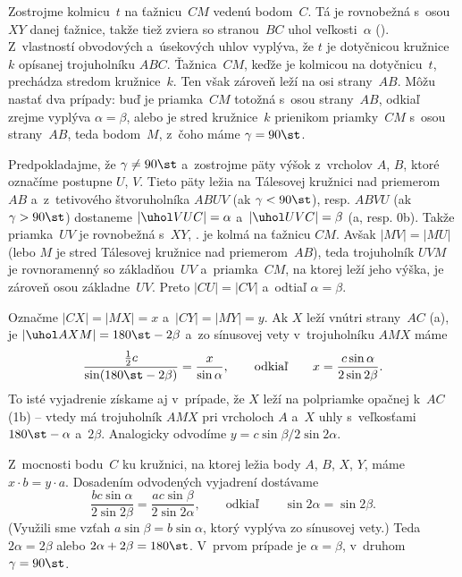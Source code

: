 {\ineriesenie
Zostrojme kolmicu~$t$ na ťažnicu~$CM$ vedenú bodom~$C$. Tá je rovnobežná s~osou $XY$ danej ťažnice, takže tiež zviera so stranou~$BC$ uhol %
veľkosti~$\alpha$ (\obr). Z~vlastností obvodových a~úsekových uhlov vyplýva, že $t$ je dotyčnicou kružnice~$k$ opísanej trojuholníku $ABC$. Ťažnica~$CM$, keďže je kolmicou na dotyčnicu~$t$, prechádza stredom kružnice~$k$. Ten však zároveň leží na osi strany~$AB$. Môžu nastať dva prípady: buď je priamka~$CM$ totožná s~osou strany~$AB$, odkiaľ zrejme vyplýva $\alpha=\beta$, alebo je stred kružnice~$k$ prienikom priamky~$CM$ s~osou strany~$AB$, teda bodom~$M$, z~čoho máme $\gamma=90\st$.

\ineriesenie
Predpokladajme, že $\gamma\ne90\st$ a~zostrojme päty výšok z~vrcholov $A$, $B$, ktoré označíme postupne $U$, $V$. Tieto päty ležia na Tálesovej kružnici nad priemerom~$AB$ a~z~tetivového štvoruholníka $ABUV$ (ak $\gamma<90\st$), resp. $ABVU$ (ak $\gamma>90\st$) dostaneme $|\uhol VUC|=\alpha$ a~$|\uhol UVC|=\beta$ (\obr{}a, resp. \obrrnum0b). Takže priamka~$UV$ je rovnobežná s~$XY$, \tj. je kolmá na ťažnicu $CM$. Avšak $|MV|=|MU|$ (lebo $M$ je stred Tálesovej kružnice nad priemerom~$AB$), teda trojuholník $UVM$ je rovnoramenný so základňou~$UV$ a~priamka~$CM$, na ktorej leží jeho výška, je zároveň osou základne~$UV$. Preto $|CU|=|CV|$ a~odtiaľ $\alpha=\beta$.
%

\ineriesenie
Označme $|CX|=|MX|=x$ a~$|CY|=|MY|=y$. Ak $X$ leží vnútri strany~$AC$ (\obr{}a), je $|\uhol AXM|=180\st-2\beta$ a~zo sínusovej vety v~trojuholníku $AMX$ máme
$$
\frac{\frac12c}{\sin(180\st-2\beta)}=\frac x{\sin\alpha},\qquad\text{odkiaľ}\qquad x=\frac{c\sin\alpha}{2\sin2\beta}.
$$
To isté vyjadrenie získame aj v~prípade, že $X$ leží na polpriamke opačnej k~$AC$ (\obrr1b) -- vtedy má trojuholník $AMX$ pri vrcholoch $A$ a~$X$ uhly s~veľkosťami $180\st-\alpha$ a~$2\beta$. Analogicky odvodíme $y=c\sin\beta/2\sin2\alpha$.
%

Z~mocnosti bodu~$C$ ku kružnici, na ktorej ležia body $A$, $B$, $X$, $Y$, máme $x\cdot b=y\cdot a$. Dosadením odvodených vyjadrení dostávame
$$
\frac{bc\sin\alpha}{2\sin2\beta}=\frac{ac\sin\beta}{2\sin2\alpha},\qquad\text{odkiaľ}\qquad \sin2\alpha=\sin2\beta.
$$
(Využili sme vzťah $a\sin\beta=b\sin\alpha$, ktorý vyplýva zo sínusovej vety.) Teda $2\alpha=2\beta$ alebo $2\alpha+2\beta=180\st$. V~prvom prípade je $\alpha=\beta$, v~druhom $\gamma=90\st$.

}

